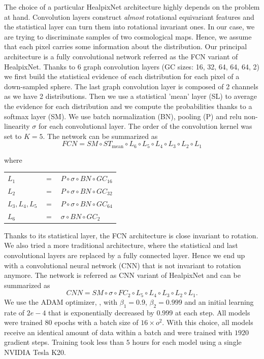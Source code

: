 \documentclass[final,twocolumn,3p,times,authoryear]{elsarticle}
\newcommand{\1}{\b{1}}              %
\newcommand{\0}{\b{0}}              %
\begin{document}
The choice of a particular HealpixNet architecture highly depends on the problem at hand. Convolution layers construct \emph{almost} rotational equivariant features and the statistical layer can turn them into rotational invariant ones. In our case, we are trying to discriminate samples of two cosmological maps. Hence, we assume that each pixel carries some information about the distribution. Our principal architecture is a fully convolutional network referred as the FCN variant of HealpixNet. Thanks to 6 graph convolution layers (GC sizes: 16, 32, 64, 64, 64, 2) we first build the statistical evidence of each distribution for each pixel of a down-sampled sphere. The last graph convolution layer is composed of 2 channels as we have 2 distributions. Then we use a statistical 'mean' layer (SL) to average the evidence for each distribution and we compute the probabilities thanks to a softmax layer (SM). We use batch normalization (BN), pooling (P) and relu non-linearity $\sigma$ for each convolutional layer. The order of the convolution kernel was set to $K=5$. The network can be summarized as
\begin{equation}
FCN = SM \circ ST_{\text{mean}} \circ L_6 \circ L_5 \circ L_4 \circ L_3 \circ L_2 \circ L_1
\end{equation}
\begin{center}
where \hspace{0.5cm} \begin{tabular}{lll}
   $L_1$ &  $=$ &$ P  \circ \sigma \circ BN  \circ GC_{16}$ \\
   $L_2$ &  $=$ &$ P  \circ \sigma \circ BN  \circ GC_{32}$ \\
   $L_3,L_4,L_5$ & $=$ &$ P \circ  \sigma \circ BN  \circ GC_{64}$ \\
   $L_6$ &  $=$& $ \sigma \circ BN  \circ GC_{2}$ \\
\end{tabular}
\end{center}
Thanks to its statistical layer, the FCN architecture is close invariant to rotation.
We also tried a more traditional architecture, where the statistical and last convolutional layers are replaced by a fully connected layer. Hence we end up with a convolutional neural network (CNN) that is not invariant to rotation anymore. The network is referred as CNN variant of HealpixNet and can be summarized as
\begin{equation}
CNN = SM \circ \sigma \circ FC_2 \circ L_5 \circ L_4 \circ L_3 \circ L_2 \circ L_1.
\end{equation}
We use the ADAM optimizer, \cite{kingma2014adam}, with $\beta_1=0.9$, $\beta_2=0.999$ and an initial learning rate of $2e-4$ that is exponentially decreased by $0.999$ at each step.
All models were trained $80$ epochs with a batch size of $16\times o^2$. With this choice, all models receive an identical amount of data within a batch and were trained with $1920$ gradient steps.
Training took less than $5$ hours for each model using a single NVIDIA Tesla K20.
\end{document}
